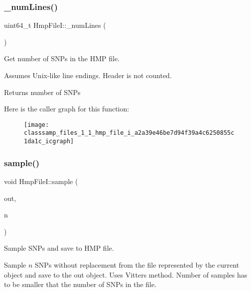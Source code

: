 \subsubsection{\texorpdfstring{\+\_\+num\+Lines()}{\_numLines()}}
{\footnotesize\ttfamily uint64\+\_\+t Hmp\+File\+I\+::\+\_\+num\+Lines (\begin{DoxyParamCaption}{ }\end{DoxyParamCaption})\hspace{0.3cm}{\ttfamily [protected]}}



Get number of S\+N\+Ps in the H\+MP file. 

Assumes Unix-\/like line endings. Header is not counted.

\begin{DoxyReturn}{Returns}
number of S\+N\+Ps 
\end{DoxyReturn}
Here is the caller graph for this function\+:\nopagebreak
\begin{figure}[H]
\begin{center}
\leavevmode
\texttt{[image: classsamp\_files\_1\_1\_hmp\_file\_i\_a2a39e46be7d94f39a4c6250855c1da1c\_icgraph]}
\end{center}
\end{figure}
\mbox{\label{classsamp_files_1_1_hmp_file_i_afd02563de7ecb89a94e8af4110676710}} 
\subsubsection{\texorpdfstring{sample()}{sample()}}
{\footnotesize\ttfamily void Hmp\+File\+I\+::sample (\begin{DoxyParamCaption}\item[{\hyperlink{classsamp_files_1_1_hmp_file_o}{Hmp\+FileO} \&}]{out,  }\item[{const uint64\+\_\+t \&}]{n }\end{DoxyParamCaption})}



Sample S\+N\+Ps and save to H\+MP file. 

Sample $n$ S\+N\+Ps without replacement from the file represented by the current object and save to the {\ttfamily out} object. Uses Vitter\textquotesingle{}s \cite{vitter87a} method. Number of samples has to be smaller that the number of S\+N\+Ps in the file.


